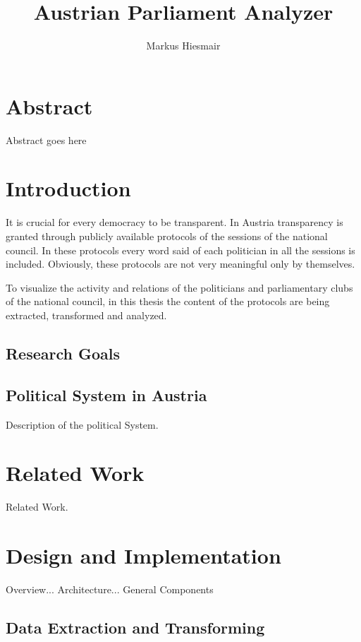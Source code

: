 \documentclass[12pt]{report}
\title{Austrian Parliament Analyzer}
\author{Markus Hiesmair}
\begin{document}
\maketitle
\newpage

\chapter*{Abstract}
Abstract goes here

\tableofcontents


\chapter{Introduction}
It is crucial for every democracy to be transparent. In Austria transparency is granted through publicly available protocols of the sessions of the national council. In these protocols every word said of each politician in all the sessions is included. Obviously, these protocols are not very meaningful only by themselves.

To visualize the activity and relations of the politicians and parliamentary clubs of the national council, in this thesis the content of the protocols are being extracted, transformed and analyzed.

\section{Research Goals}


\section{Political System in Austria}
Description of the political System.

\chapter{Related Work}
Related Work.

\chapter{Design and Implementation}

Overview... Architecture... General Components

\section{Data Extraction and Transforming}
\end{document}
